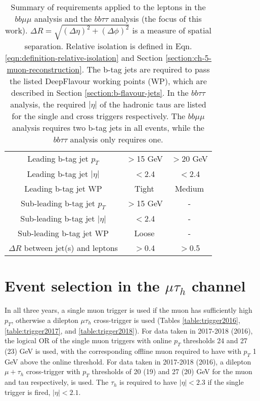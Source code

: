 \begin{table}[]
\begin{tabular}{|ccccc|}
    \multicolumn{1}{|c|}{Leading b-tag jet $p_{T}$}             & \multicolumn{1}{c|}{$>$15 GeV}  & \multicolumn{3}{c|}{$>$20 GeV}     \\
    \multicolumn{1}{|c|}{Leading b-tag jet $|\eta|$}            & \multicolumn{1}{c|}{$<$2.4}     & \multicolumn{3}{c|}{$<$2.4}                 \\
    \multicolumn{1}{|c|}{Leading b-tag jet WP}                  & \multicolumn{1}{c|}{Tight}      & \multicolumn{3}{c|}{Medium}                 \\
    \multicolumn{1}{|c|}{Sub-leading b-tag jet $p_{T}$}         & \multicolumn{1}{l|}{$>$15 GeV}  & \multicolumn{3}{c|}{-}                      \\
    \multicolumn{1}{|c|}{Sub-leading b-tag jet $|\eta|$}        & \multicolumn{1}{c|}{$<$2.4}     & \multicolumn{3}{c|}{-}                      \\
    \multicolumn{1}{|c|}{Sub-leading b-tag jet WP}              & \multicolumn{1}{c|}{Loose}      & \multicolumn{3}{c|}{-}                      \\
    \multicolumn{1}{|c|}{$\Delta R$ between jet(s) and leptons} & \multicolumn{1}{c|}{$>$0.4}     & \multicolumn{3}{c|}{$>$0.5}                 \\ \hline
    \end{tabular}
    \caption{Summary of requirements applied to the leptons in the $bb\mu\mu$ analysis and the $bb\tau\tau$ analysis (the focus of this work). $\Delta R = \sqrt{(\Delta \eta)^2 + (\Delta \phi)^2}$ is a measure of spatial separation. Relative isolation is defined in Eqn. \ref{eqn:definition-relative-isolation} and Section \ref{section:ch-5-muon-reconstruction}. The b-tag jets are required to pass the listed DeepFlavour working points (WP), which are described in Section \ref{section:b-flavour-jets}. In the $bb\tau\tau$ analysis, the required $|\eta|$ of the hadronic taus are listed for the single and cross triggers respectively. The $bb\mu\mu$ analysis requires two b-tag jets in all events, while the $bb\tau\tau$ analysis only requires one.}
    \label{table:object_selections}
\end{table}

\section{Event selection in the \texorpdfstring{$\mu\tau_{h}$}{mutauh} channel}
\label{section:ch-6-event-selection-mutau}
In all three years, a single muon trigger is used if the muon has sufficiently high $p_{T}$, otherwise a dilepton $\mu\tau_{h}$ cross-trigger is used (Tables \ref{table:trigger2016}, \ref{table:trigger2017}, and \ref{table:trigger2018}). For data taken in 2017-2018 (2016), the logical OR of the single muon triggers with online $p_{T}$ thresholds 24 and 27 (23) GeV is used, with the corresponding offline muon required to have with $p_{T}$ 1 GeV above the online threshold. For data taken in 2017-2018 (2016), a dilepton $\mu + \tau_{h}$ cross-trigger with $p_{T}$ thresholds of 20 (19) and 27 (20) GeV for the muon and tau respectively, is used. The $\tau_{h}$ is required to have $|\eta| < 2.3$ if the single trigger is fired, $|\eta| < 2.1$. 

